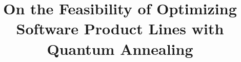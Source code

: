\documentclass{sig-alternate-05-2015}
\begin{document}






%

\title{On the Feasibility of Optimizing Software Product Lines with Quantum Annealing}

%
%
%
%
\end{document}
